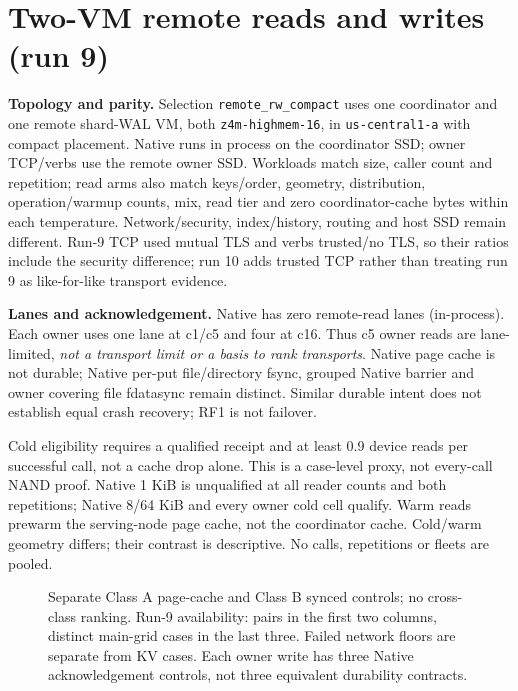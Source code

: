 \clearpage
\section{Two-VM remote reads and writes (run 9)}\label{sec:rwc}
\textbf{\RWCstate} 

\textbf{Topology and parity.} Selection \texttt{remote\_rw\_compact} uses one coordinator and one remote shard-WAL VM, both \texttt{z4m-highmem-16}, in \texttt{us-central1-a} with compact placement. Native runs in process on the coordinator SSD; owner TCP/verbs use the remote owner SSD. Workloads match size, caller count and repetition; read arms also match keys/order, geometry, distribution, operation/warmup counts, mix, read tier and zero coordinator-cache bytes within each temperature. Network/security, index/history, routing and host SSD remain different. Run-9 TCP used mutual TLS and verbs trusted/no TLS, so their ratios include the security difference; run 10 adds trusted TCP rather than treating run 9 as like-for-like transport evidence.

\textbf{Lanes and acknowledgement.} Native has zero remote-read lanes (in-process). Each owner uses one lane at c1/c5 and four at c16. Thus c5 owner reads are lane-limited, \emph{not a transport limit or a basis to rank transports}. Native page cache is not durable; Native per-put file/directory fsync, grouped Native barrier and owner covering file fdatasync remain distinct. Similar durable intent does not establish equal crash recovery; RF1 is not failover.

Cold eligibility requires a qualified receipt and at least 0.9 device reads per successful call, not a cache drop alone. This is a case-level proxy, not every-call NAND proof. Native 1 KiB is unqualified at all reader counts and both repetitions; Native 8/64 KiB and every owner cold cell qualify. Warm reads prewarm the serving-node page cache, not the coordinator cache. Cold/warm geometry differs; their contrast is descriptive. No calls, repetitions or fleets are pooled.
\begin{figure}[H]\centering{}
\caption{Separate Class A page-cache and Class B synced controls; no cross-class ranking. Run-9 availability: pairs in the first two columns, distinct main-grid cases in the last three. Failed network floors are separate from KV cases. Each owner write has three Native acknowledgement controls, not three equivalent durability contracts.}
\end{figure}


